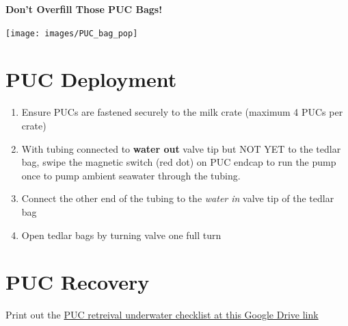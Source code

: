 \documentclass[
]{book}
\providecommand{\tightlist}{%
  \setlength{\itemsep}{0pt}\setlength{\parskip}{0pt}}
\begin{document}
\textbf{Don't Overfill Those PUC Bags!}

\texttt{[image: images/PUC\_bag\_pop]}

\hypertarget{puc-deployment}{%
\section{PUC Deployment}\label{puc-deployment}}

\begin{enumerate}
\def\labelenumi{\arabic{enumi}.}
\tightlist
\item
  Ensure PUCs are fastened securely to the milk crate (maximum 4 PUCs per crate)
\item
  With tubing connected to \textbf{water out} valve tip but NOT YET to the tedlar bag, swipe the magnetic switch (red dot) on PUC endcap to run the pump once to pump ambient seawater through the tubing.
\item
  Connect the other end of the tubing to the \emph{water in} valve tip of the tedlar bag
\item
  Open tedlar bags by turning valve one full turn
\end{enumerate}

\hypertarget{puc-recovery}{%
\section{PUC Recovery}\label{puc-recovery}}

Print out the \href{https://drive.google.com/drive/folders/1X6fAG4OIDs66Ji5xzYsX8JySqhkSs5k-}{PUC retreival underwater checklist at this Google Drive link}
\end{document}
